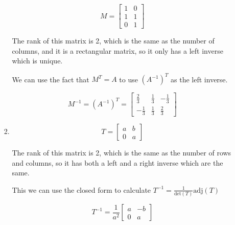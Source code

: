 \documentclass[12pt,letterpaper]{article}
\begin{document}
\begin{enumerate}[label=\S 2.\arabic*]
\begin{enumerate}
\begin{enumerate}
              \[
                M =
                \begin{bmatrix}
                  1 & 0 \\
                  1 & 1 \\
                  0 & 1
                \end{bmatrix}
              \]

              The rank of this matrix is 2, which is the same as the number of columns, and it is a rectangular matrix, so it only has a left inverse which is unique.

              We can use the fact that $M^T = A$ to use $(A^{-1})^T$ as the left inverse.

              \[
                M^{-1} = (A^{-1})^T =
                \begin{bmatrix}
                  \frac{2}{3} & \frac{1}{3} & -\frac{1}{3} \\
                  -\frac{1}{3} & \frac{1}{3} & \frac{2}{3}
                \end{bmatrix}
              \]
            \item
              \[
                T =
                \begin{bmatrix}
                  a & b \\
                  0 & a
                \end{bmatrix}
              \]

              The rank of this matrix is 2, which is the same as the number of rows and columns, so it has both a left and a right inverse which are the same.

              This we can use the closed form to calculate $T^{-1} = \frac{1}{\text{det}(T)}\text{adj}(T)$

              \[
                T^{-1} =
                \frac{1}{a^2}
                \begin{bmatrix}
                  a & -b \\
                  0 & a
                \end{bmatrix}
              \]
          \end{enumerate}


\end{enumerate}
\end{enumerate}
\end{document}
